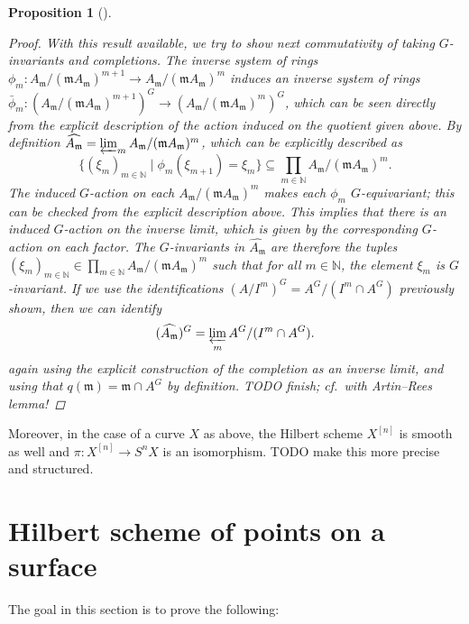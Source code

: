 \documentclass[12pt,a4paper]{amsart}
\theoremstyle{plain}
\newtheorem{prop}[thm]{Proposition}
\theoremstyle{definition}
\theoremstyle{remark}
\begin{document}
\begin{prop}[{\cite[Proposition 3.1]{rot16}}]
\begin{proof}
    With this result available, we try to show next commutativity of taking $G$-invariants and completions.
    The inverse system of rings $\phi_{m} \colon A_{\mathfrak{m}}/(\mathfrak{m}A_{\mathfrak{m}})^{m+1} \to A_{\mathfrak{m}}/(\mathfrak{m}A_{\mathfrak{m}})^{m}$ induces an inverse system of rings $\bar{\phi}_{m} \colon (A_{\mathfrak{m}}/(\mathfrak{m}A_{\mathfrak{m}})^{m+1})^{G} \to (A_{\mathfrak{m}}/(\mathfrak{m}A_{\mathfrak{m}})^{m})^{G}$, which can be seen directly from the explicit description of the action induced on the quotient given above.
    By definition $\widehat{A_{\mathfrak{m}}} = \varprojlim_{m} A_{\mathfrak{m}}/(\mathfrak{m}A_{\mathfrak{m}})^{m}$, which can be explicitly described as
    \[ \{ (\xi_{m})_{m \in \mathbb{N}} \mid \phi_{m}(\xi_{m+1}) = \xi_{m} \} \subseteq \prod_{m \in \mathbb{N}} A_{\mathfrak{m}}/(\mathfrak{m}A_{\mathfrak{m}})^{m}. \]
    The induced $G$-action on each $A_{\mathfrak{m}}/(\mathfrak{m}A_{\mathfrak{m}})^{m}$ makes each $\phi_{m}$ $G$-equivariant; this can be checked from the explicit description above.
    This implies that there is an induced $G$-action on the inverse limit, which is given by the corresponding $G$-action on each factor.
    The $G$-invariants in $\widehat{A_{\mathfrak{m}}}$ are therefore the tuples $(\xi_{m})_{m \in \mathbb{N}} \in \prod_{m \in \mathbb{N}} A_{\mathfrak{m}}/(\mathfrak{m}A_{\mathfrak{m}})^{m}$ such that for all $m \in \mathbb{N}$, the element $\xi_{m}$ is $G$-invariant.
    If we use the identifications $(A/I^{m})^{G} = A^{G}/(I^{m} \cap A^{G})$ previously shown, then we can identify
    \[ (\widehat{A_{\mathfrak{m}}})^{G} = \varprojlim_{m} A^{G}/(I^{m} \cap A^{G}). \]
    again using the explicit construction of the completion as an inverse limit, and using that $q(\mathfrak{m}) = \mathfrak{m} \cap A^{G}$ by definition.
    \color{red} TODO finish; cf.~with Artin--Rees lemma! \color{black}
  \end{proof}
\end{prop}

Moreover, in the case of a curve $X$ as above, the Hilbert scheme $X^{[n]}$ is smooth as well and $\pi \colon X^{[n]} \to S^{n}X$ is an isomorphism.
\color{red} TODO make this more precise and structured. \color{black}

\section{Hilbert scheme of points on a surface}

The goal in this section is to prove the following:
\end{document}
